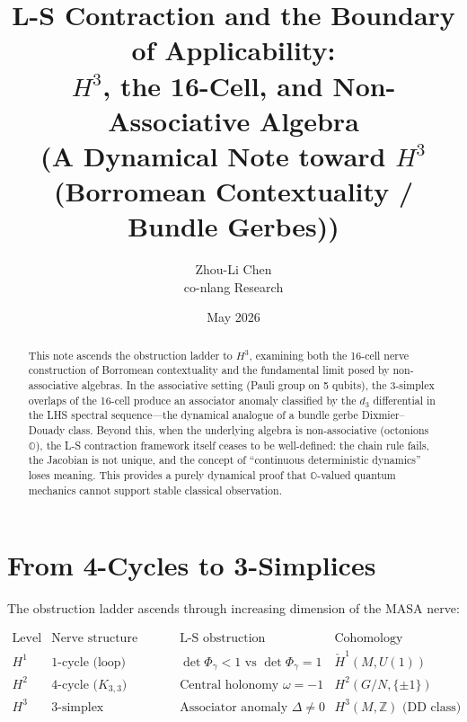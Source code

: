 \documentclass[11pt]{article}
\begin{document}
\title{L-S Contraction and the Boundary of Applicability:\\
$H^3$, the 16-Cell, and Non-Associative Algebra\\
{\large (A Dynamical Note toward $H^3$ (Borromean Contextuality / Bundle Gerbes))}}

\author{Zhou-Li Chen \\ co-nlang Research}
\date{May 2026}

\maketitle

\begin{abstract}
This note ascends the obstruction ladder to $H^3$, examining both the
16-cell nerve construction of Borromean contextuality and the fundamental
limit posed by non-associative algebras. In the associative setting
(Pauli group on 5 qubits), the 3-simplex overlaps of the 16-cell produce
an associator anomaly classified by the $d_3$ differential in the LHS
spectral sequence---the dynamical analogue of a bundle gerbe
Dixmier--Douady class. Beyond this, when the underlying algebra is
non-associative (octonions $\mathbb{O}$), the L-S contraction framework
itself ceases to be well-defined: the chain rule fails, the Jacobian
is not unique, and the concept of ``continuous deterministic dynamics''
loses meaning. This provides a purely dynamical proof that
$\mathbb{O}$-valued quantum mechanics cannot support stable classical
observation.
\end{abstract}

\section{From 4-Cycles to 3-Simplices}
\label{sec:intro}

The obstruction ladder ascends through increasing dimension of the
MASA nerve:

\[
\begin{array}{cccc}
\text{Level} & \text{Nerve structure} & \text{L-S obstruction} & \text{Cohomology} \\
\hline
H^1 & \text{1-cycle (loop)} & \det\Phi_\gamma < 1 \text{ vs } \det\Phi_\gamma = 1 & \check{H}^1(M, U(1)) \\
H^2 & \text{4-cycle ($K_{3,3}$)} & \text{Central holonomy } \omega = -1 & H^2(G/N, \{\pm 1\}) \\
H^3 & \text{3-simplex (tetrahedron)} & \text{Associator anomaly } \Delta \neq 0 & H^3(M, \mathbb{Z}) \text{ (DD class)} \\
\end{array}
\]
\end{document}
